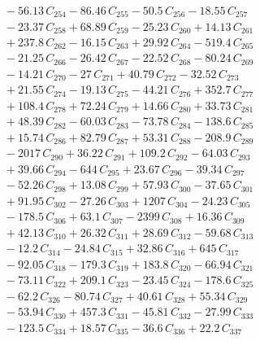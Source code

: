 \documentclass[a4paper,11pt]{article}
\begin{document}
\begin{align}
&\quad - 56.13\,C_{254} - 86.46\,C_{255} - 50.5\,C_{256} - 18.55\,C_{257} \nonumber\\
&\quad - 23.37\,C_{258} + 68.89\,C_{259} - 25.23\,C_{260} + 14.13\,C_{261} \nonumber\\
&\quad + 237.8\,C_{262} - 16.15\,C_{263} + 29.92\,C_{264} - 519.4\,C_{265} \nonumber\\
&\quad - 21.25\,C_{266} - 26.42\,C_{267} - 22.52\,C_{268} - 80.24\,C_{269} \nonumber\\
&\quad - 14.21\,C_{270} - 27\,C_{271} + 40.79\,C_{272} - 32.52\,C_{273} \nonumber\\
&\quad + 21.55\,C_{274} - 19.13\,C_{275} - 44.21\,C_{276} + 352.7\,C_{277} \nonumber\\
&\quad + 108.4\,C_{278} + 72.24\,C_{279} + 14.66\,C_{280} + 33.73\,C_{281} \nonumber\\
&\quad + 48.39\,C_{282} - 60.03\,C_{283} - 73.78\,C_{284} - 138.6\,C_{285} \nonumber\\
&\quad + 15.74\,C_{286} + 82.79\,C_{287} + 53.31\,C_{288} - 208.9\,C_{289} \nonumber\\
&\quad - 2017\,C_{290} + 36.22\,C_{291} + 109.2\,C_{292} - 64.03\,C_{293} \nonumber\\
&\quad + 39.66\,C_{294} - 644\,C_{295} + 23.67\,C_{296} - 39.34\,C_{297} \nonumber\\
&\quad - 52.26\,C_{298} + 13.08\,C_{299} + 57.93\,C_{300} - 37.65\,C_{301} \nonumber\\
&\quad + 91.95\,C_{302} - 27.26\,C_{303} + 1207\,C_{304} - 24.23\,C_{305} \nonumber\\
&\quad - 178.5\,C_{306} + 63.1\,C_{307} - 2399\,C_{308} + 16.36\,C_{309} \nonumber\\
&\quad + 42.13\,C_{310} + 26.32\,C_{311} + 28.69\,C_{312} - 59.68\,C_{313} \nonumber\\
&\quad - 12.2\,C_{314} - 24.84\,C_{315} + 32.86\,C_{316} + 645\,C_{317} \nonumber\\
&\quad - 92.05\,C_{318} - 179.3\,C_{319} + 183.8\,C_{320} - 66.94\,C_{321} \nonumber\\
&\quad - 73.11\,C_{322} + 209.1\,C_{323} - 23.45\,C_{324} - 178.6\,C_{325} \nonumber\\
&\quad - 62.2\,C_{326} - 80.74\,C_{327} + 40.61\,C_{328} + 55.34\,C_{329} \nonumber\\
&\quad - 53.94\,C_{330} + 457.3\,C_{331} - 45.81\,C_{332} - 27.99\,C_{333} \nonumber\\
&\quad - 123.5\,C_{334} + 18.57\,C_{335} - 36.6\,C_{336} + 22.2\,C_{337} \nonumber\\

\end{align}
\end{document}
